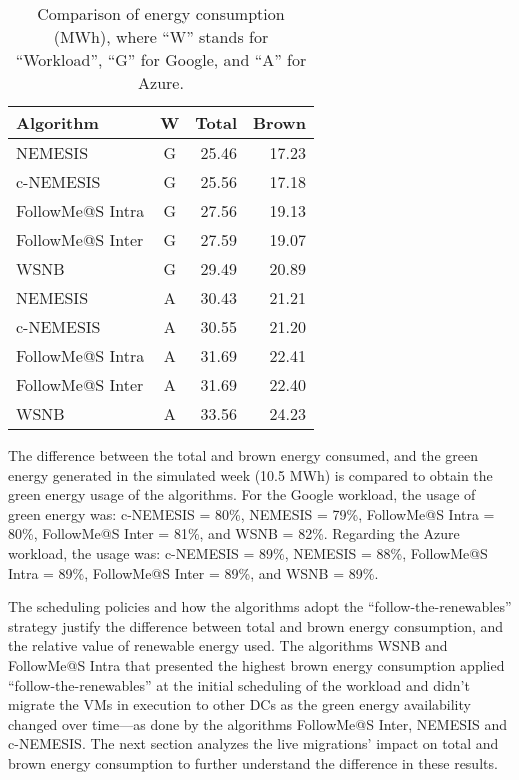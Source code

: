 \begin{table}[!h]
\caption{Comparison of energy consumption (MWh), where ``W'' stands for ``Workload'', ``G'' for Google, and ``A'' for Azure.}\label{tab:total_energy_cons} \centering
\begin{tabular}{|l|c|r|r|}
  \hline
  \textbf{Algorithm} & \textbf{W} & \textbf{Total} &  \textbf{Brown} \\
  \hline  
  NEMESIS  & G & 25.46 & 17.23 \\
  \hline
  c-NEMESIS & G & 25.56 & 17.18 \\
  \hline
  FollowMe@S Intra  & G & 27.56 & 19.13 \\
  \hline
  FollowMe@S Inter  & G & 27.59 & 19.07 \\
  \hline
  WSNB  & G & 29.49 & 20.89 \\
  \hline
  NEMESIS  & A  & 30.43 & 21.21 \\
  \hline
  c-NEMESIS & A  & 30.55 & 21.20 \\
  \hline
  FollowMe@S Intra  & A  & 31.69 & 22.41 \\
  \hline
  FollowMe@S Inter  & A  & 31.69 & 22.40 \\
  \hline
  WSNB & A   & 33.56 & 24.23 \\
  \hline
\end{tabular}
\end{table}


The difference between the total and brown energy consumed, and the green energy generated in the simulated week (10.5 MWh) is compared to obtain the green energy usage of the algorithms. For the Google workload, the usage of green energy was: c-NEMESIS = 80\%, NEMESIS = 79\%, FollowMe@S Intra = 80\%, FollowMe@S Inter = 81\%, and WSNB = 82\%. Regarding the Azure workload, the usage was: c-NEMESIS = 89\%, NEMESIS = 88\%, FollowMe@S Intra = 89\%, FollowMe@S Inter = 89\%, and WSNB = 89\%. 


The scheduling policies and how the algorithms adopt the ``follow-the-renewables'' strategy justify the difference between total and brown energy consumption, and the relative value of renewable energy used. The algorithms WSNB and FollowMe@S Intra that presented the highest brown energy consumption applied ``follow-the-renewables'' at the initial scheduling of the workload and didn't migrate the VMs in execution to other DCs as the green energy availability changed over time---as done by the algorithms FollowMe@S Inter, NEMESIS and c-NEMESIS. The next section analyzes the live migrations' impact on total and brown energy consumption to further understand the difference in these results.


